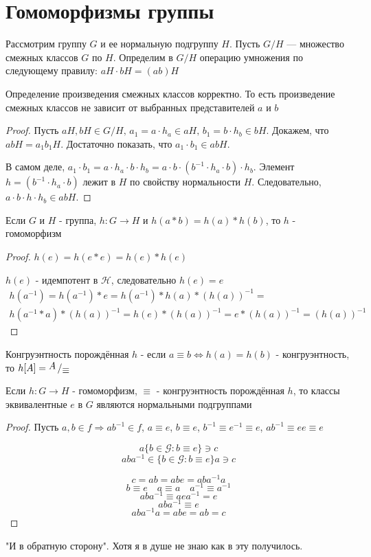 \documentclass[../main/document.tex]{subfiles}
\begin{document}
\section{Гомоморфизмы группы}
\begin{dfn}[Факторгруппа]
Рассмотрим группу $G$ и ее нормальную подгруппу $H$. Пусть $G/H$ — множество смежных классов $G$ по $H$. Определим в $G/H$ операцию умножения по следующему правилу: $aH\cdot bH=(ab)H$
\end{dfn}

\begin{thm}
Определение произведения смежных классов корректно. То есть произведение смежных классов не зависит от выбранных представителей $a$ и $b$
\begin{proof}
Пусть $aH,bH\in G/H,\,a_1=a\cdot h_a\in aH,\,b_1=b\cdot h_b\in bH$. Докажем, что $abH=a_1 b_1 H$. Достаточно показать, что $a_1\cdot b_1 \in abH$.

В самом деле, $a_1\cdot b_1=a\cdot h_a\cdot b\cdot h_b=a\cdot b\cdot (b^{-1}\cdot h_a\cdot b)\cdot h_b$. Элемент $h = (b^{-1}\cdot h_a\cdot b)$ лежит в $H$ по свойству нормальности $H$. Следовательно, $a\cdot b\cdot h\cdot h_b\in abH$.
\end{proof}
\end{thm}

\begin{thm}
Если $G$ и $H$ - группа, $h:G\rightarrow H$ и $h(a*b)=h(a)*h(b)$, то $h$ - гомоморфизм
\begin{proof}
$h(e)=h(e*e)=h(e)*h(e)$

$h(e)$ - идемпотент в $\mathcal{H}$, следовательно $h(e)=e$
\begin{multline*}
h(a^{-1})=h(a^{-1})*e=h(a^{-1})*h(a)*(h(a))^{-1}=\\
h(a^{-1}*a)*(h(a))^{-1}=h(e)*(h(a))^{-1}=e*(h(a))^{-1}=(h(a))^{-1}
\end{multline*}
\end{proof}
\end{thm}

\begin{dfn}
Конгруэнтность порождённая $h$ - если $a\equiv b \Leftrightarrow h(a)=h(b)$ - конгруэнтность, то $h[A]= \bigslant{A}{\equiv}$ 
\end{dfn}

\begin{thm}
Если $h:G\rightarrow H$ - гомоморфизм, $\equiv$ - конгруэнтность порождённая $h$, то классы эквивалентные $e$ в $G$ являются нормальными подгруппами
\begin{proof}
Пусть $a,b\in f\Rightarrow ab^{-1}\in f$, $a\equiv e$, $b\equiv e$, $b^{-1}\equiv e^{-1}\equiv e$, $ab^{-1}\equiv ee\equiv e$

$$a\{b\in \mathcal{G}:b\equiv e\}\ni c$$
$$aba^{-1}\in\{b\in \mathcal{G}:b\equiv e\}a\ni c$$

$$c=ab=abe=aba^{-1}a$$
$$b\equiv e \quad a\equiv a\quad a^{-1}\equiv a^{-1}$$
$$aba^{-1}\equiv aea^{-1}=e$$
$$aba^{-1}\equiv e$$
$$aba^{-1}a=abe=ab=c$$
\end{proof}
"И в обратную сторону". Хотя я в душе не знаю как в эту получилось.
\end{thm}
\end{document}
